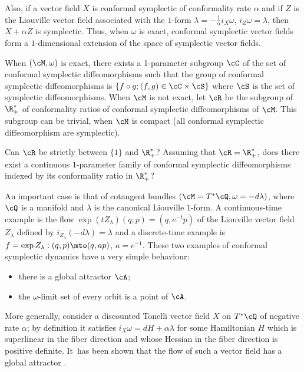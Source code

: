 Also, if a vector field $X$ is conformal symplectic of conformality rate $\alpha$ and if $Z$ is the Liouville vector field associated with the $1$-form $\lambda= - \frac{1}{\alpha}i_X\omega$, \ie $i_Z\omega = \lambda$, then $X+\alpha Z$ is symplectic. Thus, when $\omega$ is exact, conformal symplectic vector fields form a $1$-dimensional extension of the space of symplectic vector fields.

When $(\cM, \omega)$ is exact, there exists a 1-parameter subgroup $\cC$ of the set of conformal symplectic diffeomorphisms such that the group of conformal symplectic diffeomorphisms is $\{f\circ g; (f, g)\in \cC\times\cS\}$ where $\cS$ is the set of symplectic diffeomorphisms. When $\cM$ is not exact, let $\cR$ be the subgroup of $\R_+^*$ of conformality ratios of conformal symplectic diffeomorphisms of $\cM$. This subgroup can be trivial, \eg when $\cM$ is compact (all conformal symplectic diffeomorphism are symplectic).

\begin{questions*}
Can $\cR$ be strictly between $\{1\}$ and $\R^*_+$? Assuming that $\cR=\R^*_+$, does there exist a continuous $1$-para\-meter family of conformal symplectic diffeomorphisms indexed by its conformality ratio in $\R^*_+$?
\end{questions*}

An important case is that of cotangent bundles $(\cM = T^*\cQ, \omega=-d\lambda)$, where $\cQ$ is a manifold and $\lambda$ is the canonical Liouville $1$-form. A continuous-time example is the flow $\exp(tZ_\lambda)(q, p)=(q, e^{-t}p)$ of the Liouville vector field $Z_\lambda$ defined by $i_{Z_\lambda}(-d\lambda)=\lambda$ and
a discrete-time example is $f = \exp Z_\lambda: (q, p) \mto (q, a p)$, $a=e^{-1}$. These two examples of conformal symplectic dynamics have a very simple behaviour:
\begin{itemize}
\item there is a global attractor $\cA$;
\item the $\omega$-limit set of every orbit is a point of $\cA$.
\end{itemize}
More generally, consider a discounted Tonelli vector field $X$ on $T^*\cQ$ of negative rate $\alpha$; by definition it satisfies $i_X\omega = dH + \alpha \lambda$ for some Hamiltonian $H$ which is superlinear in the fiber direction and whose Hessian in the fiber direction is positive definite. It~has been shown that the flow of such a vector field has a global attractor \cite{MarSor2017}.

